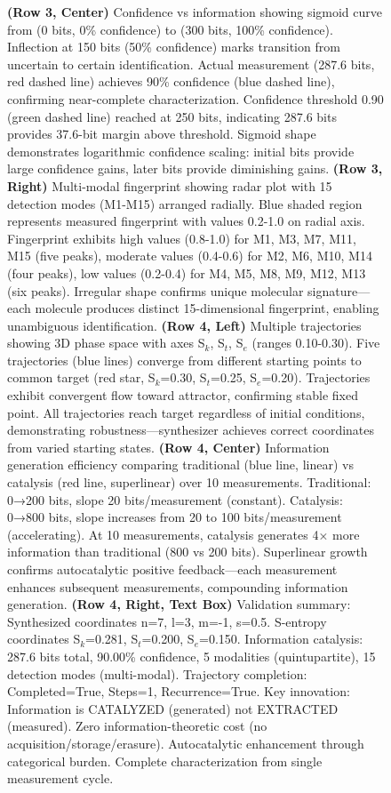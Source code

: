 \begin{figure}[htbp]
{    \textbf{(Row 3, Center)} Confidence vs information showing sigmoid curve from (0 bits, 0\% confidence) to (300 bits, 100\% confidence). Inflection at 150 bits (50\% confidence) marks transition from uncertain to certain identification. Actual measurement (287.6 bits, red dashed line) achieves 90\% confidence (blue dashed line), confirming near-complete characterization. Confidence threshold 0.90 (green dashed line) reached at 250 bits, indicating 287.6 bits provides 37.6-bit margin above threshold. Sigmoid shape demonstrates logarithmic confidence scaling: initial bits provide large confidence gains, later bits provide diminishing gains. 
    \textbf{(Row 3, Right)} Multi-modal fingerprint showing radar plot with 15 detection modes (M1-M15) arranged radially. Blue shaded region represents measured fingerprint with values 0.2-1.0 on radial axis. Fingerprint exhibits high values (0.8-1.0) for M1, M3, M7, M11, M15 (five peaks), moderate values (0.4-0.6) for M2, M6, M10, M14 (four peaks), low values (0.2-0.4) for M4, M5, M8, M9, M12, M13 (six peaks). Irregular shape confirms unique molecular signature—each molecule produces distinct 15-dimensional fingerprint, enabling unambiguous identification. 
    \textbf{(Row 4, Left)} Multiple trajectories showing 3D phase space with axes S$_k$, S$_t$, S$_e$ (ranges 0.10-0.30). Five trajectories (blue lines) converge from different starting points to common target (red star, S$_k$=0.30, S$_t$=0.25, S$_e$=0.20). Trajectories exhibit convergent flow toward attractor, confirming stable fixed point. All trajectories reach target regardless of initial conditions, demonstrating robustness—synthesizer achieves correct coordinates from varied starting states. 
    \textbf{(Row 4, Center)} Information generation efficiency comparing traditional (blue line, linear) vs catalysis (red line, superlinear) over 10 measurements. Traditional: 0→200 bits, slope 20 bits/measurement (constant). Catalysis: 0→800 bits, slope increases from 20 to 100 bits/measurement (accelerating). At 10 measurements, catalysis generates 4× more information than traditional (800 vs 200 bits). Superlinear growth confirms autocatalytic positive feedback—each measurement enhances subsequent measurements, compounding information generation. 
    \textbf{(Row 4, Right, Text Box)} Validation summary: Synthesized coordinates n=7, l=3, m=-1, s=0.5. S-entropy coordinates S$_k$=0.281, S$_t$=0.200, S$_e$=0.150. Information catalysis: 287.6 bits total, 90.00\% confidence, 5 modalities (quintupartite), 15 detection modes (multi-modal). Trajectory completion: Completed=True, Steps=1, Recurrence=True. Key innovation: Information is CATALYZED (generated) not EXTRACTED (measured). Zero information-theoretic cost (no acquisition/storage/erasure). Autocatalytic enhancement through categorical burden. Complete characterization from single measurement cycle. 
}
\end{figure}
